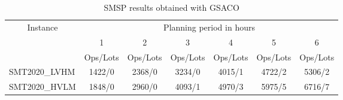 \begin{table}[]
	\caption{SMSP results obtained with GSACO}	\label{tab:results-operations} \centering
	\begin{tabular}{|l|cccccc|}
		\hline
		\multicolumn{1}{|c|}{\multirow{2}{*}{Instance}} &
		\multicolumn{6}{c|}{Planning period in hours} \\ \cline{2-7} 
		\multicolumn{1}{|c|}{} &
		\multicolumn{1}{c|}{1} &
		\multicolumn{1}{c|}{2} &
		\multicolumn{1}{c|}{3} &
		\multicolumn{1}{c|}{4} &
		\multicolumn{1}{c|}{5} &
		6 \\ \hline &
		\multicolumn{1}{l|}{Ops/Lots} &
		\multicolumn{1}{l|}{Ops/Lots} &
		\multicolumn{1}{l|}{Ops/Lots} &
		\multicolumn{1}{l|}{Ops/Lots} &
		\multicolumn{1}{c|}{Ops/Lots} &
		\multicolumn{1}{l|}{Ops/Lots} \\ \cline{2-7}
		SMT2020\_LVHM &
		\multicolumn{1}{c|}{1422/0} &
		\multicolumn{1}{c|}{2368/0} &
		\multicolumn{1}{c|}{3234/0} &
		\multicolumn{1}{c|}{4015/1} &
		\multicolumn{1}{c|}{4722/2} &
		5306/2 \\ 
		SMT2020\_HVLM &
		\multicolumn{1}{c|}{1848/0} &
		\multicolumn{1}{c|}{2960/0} &
		\multicolumn{1}{c|}{4093/1} &
		\multicolumn{1}{c|}{4970/3} &
		\multicolumn{1}{c|}{5975/5} &
		6716/7 \\ \hline
	\end{tabular}%
\end{table}


